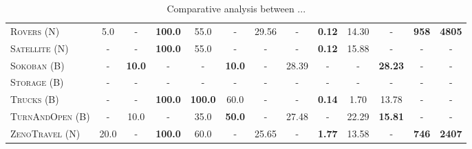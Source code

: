 \documentclass[11pt,landscape]{article}
\begin{document}
\begin{table*}[tb]
{\begin{tabular}{|l||ccccc||ccccc||c||c||}
\textsc{Rovers} (N)&5.0&-&\textbf{100.0}&55.0&-&29.56&-&\textbf{0.12}&14.30&-&\textbf{958}&\textbf{4805}\\
\textsc{Satellite} (N)&-&-&\textbf{100.0}&55.0&-&-&-&\textbf{0.12}&15.88&-&-&-\\
\textsc{Sokoban} (B)&-&\textbf{10.0}&-&-&\textbf{10.0}&-&28.39&-&-&\textbf{28.23}&-&-\\
\textsc{Storage} (B)&-&-&-&-&-&-&-&-&-&-&-&-\\
\textsc{Trucks} (B)&-&-&\textbf{100.0}&\textbf{100.0}&60.0&-&-&\textbf{0.14}&1.70&13.78&-&-\\
\textsc{TurnAndOpen} (B)&-&10.0&-&35.0&\textbf{50.0}&-&27.48&-&22.29&\textbf{15.81}&-&-\\
\textsc{ZenoTravel} (N)&20.0&-&\textbf{100.0}&60.0&-&25.65&-&\textbf{1.77}&13.58&-&\textbf{746}&\textbf{2407}
\\\hline

        \end{tabular}}
        \caption{Comparative analysis between ...}
        \label{tab:experiments}
        \end{table*}
        
\end{document}
